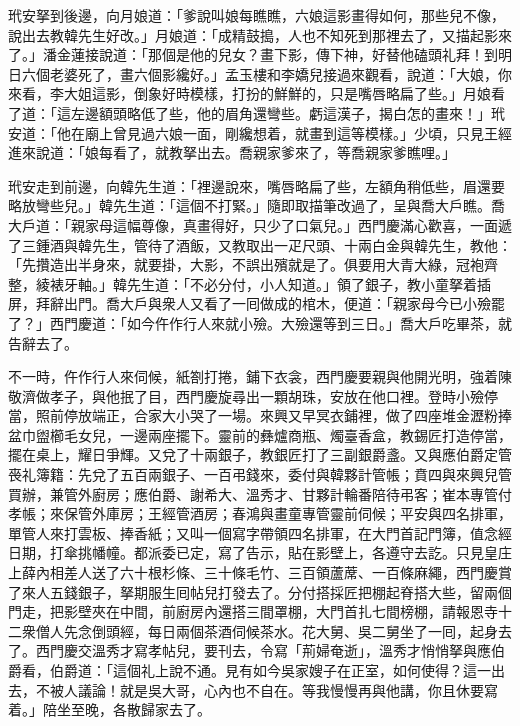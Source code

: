 玳安拏到後邊，向月娘道：「爹說叫娘每瞧瞧，六娘這影畫得如何，那些兒不像，說出去教韓先生好改。」月娘道：「成精鼓搗，人也不知死到那裡去了，又描起影來了。」潘金蓮接說道：「那個是他的兒女？畫下影，傳下神，好替他磕頭礼拜！到明日六個老婆死了，畫六個影纔好。」孟玉樓和李嬌兒接過來觀看，說道：「大娘，你來看，李大姐這影，倒象好時模樣，打扮的鮮鮮的，只是嘴唇略扁了些。」月娘看了道：「這左邊額頭略低了些，他的眉角還彎些。虧這漢子，揭白怎的畫來！」玳安道：「他在廟上曾見過六娘一面，剛纔想着，就畫到這等模樣。」少頃，只見王經進來說道：「娘每看了，就教拏出去。喬親家爹來了，等喬親家爹瞧哩。」

玳安走到前邊，向韓先生道：「裡邊說來，嘴唇略扁了些，左額角稍低些，眉還要略放彎些兒。」韓先生道：「這個不打緊。」隨即取描筆改過了，呈與喬大戶瞧。喬大戶道：「親家母這幅尊像，真畫得好，只少了口氣兒。」西門慶滿心歡喜，一面遞了三鍾酒與韓先生，管待了酒飯，又教取出一疋尺頭、十兩白金與韓先生，教他：「先攢造出半身來，就要掛，大影，不誤出殯就是了。俱要用大青大綠，冠袍齊整，綾裱牙軸。」韓先生道：「不必分付，小人知道。」領了銀子，教小童拏着插屏，拜辭出門。喬大戶與衆人又看了一囘做成的棺木，便道：「親家母今已小殮罷了？」西門慶道：「如今仵作行人來就小殮。大殮還等到三日。」喬大戶吃畢茶，就告辭去了。

不一時，仵作行人來伺候，紙劄打捲，鋪下衣衾，西門慶要親與他開光明，強着陳敬濟做孝子，{}{}與他抿了目，西門慶旋尋出一顆胡珠，安放在他口裡。登時小殮停當，照前停放端正，合家大小哭了一場。來興又早冥衣鋪裡，做了四座堆金瀝粉捧盆巾盥櫛毛女兒，一邊兩座擺下。靈前的彝爐商瓶、燭臺香盒，教錫匠打造停當，擺在桌上，耀日爭輝。又兌了十兩銀子，教銀匠打了三副銀爵盞。又與應伯爵定管䘮礼簿籍：先兌了五百兩銀子、一百弔錢來，委付與韓夥計管帳；賁四與來興兒管買辦，兼管外廚房；應伯爵、謝希大、溫秀才、甘夥計輪番陪待弔客；崔本專管付孝帳；來保管外庫房；王經管酒房；春鴻與畫童專管靈前伺候；平安與四名排軍，單管人來打雲板、捧香紙；又叫一個寫字帶領四名排軍，在大門首記門簿，值念經日期，打傘挑幡幢。都派委已定，寫了告示，貼在影壁上，各遵守去訖。只見皇庄上薛內相差人送了六十根杉條、三十條毛竹、三百領蘆蓆、一百條麻繩，西門慶賞了來人五錢銀子，拏期服生囘帖兒打發去了。分付搭採匠把棚起脊搭大些，留兩個門走，把影壁夾在中間，前廚房內還搭三間罩棚，大門首扎七間榜棚，請報恩寺十二衆僧人先念倒頭經，每日兩個茶酒伺候茶水。花大舅、吳二舅坐了一囘，起身去了。西門慶交溫秀才寫孝帖兒，要刊去，令寫「荊婦奄逝」，溫秀才悄悄拏與應伯爵看，伯爵道：「這個礼上說不通。見有如今吳家嫂子在正室，如何使得？{}這一出去，不被人議論！就是吳大哥，心內也不自在。等我慢慢再與他講，你且休要寫着。」陪坐至晚，各散歸家去了。

